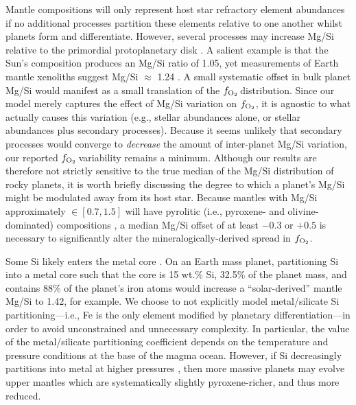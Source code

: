 \documentclass[fleqn,usenatbib,twocolumn]{mnras}
\newcommand{\fo}{$f_{\ce{O2}}$}
\newcommand{\todo}[1]{\textit{\textcolor{violet}{{#1}}}}
\begin{document}
Mantle compositions will only represent host star refractory element abundances if no additional processes partition these elements relative to one another whilst planets form and differentiate. However, several processes may increase Mg/Si relative to the primordial protoplanetary disk \citep{ringwood_significance_1989, tronnes_core_2019, miyazaki_dynamic_2020}. A salient example is that the Sun's composition produces an Mg/Si ratio of 1.05, yet measurements of Earth mantle xenoliths suggest Mg/Si $\approx$ 1.24 \citep[the bulk mantle may not be well-represented by these upper mantle xenoliths;][]{javoy_integral_1995}. A small systematic offset in bulk planet Mg/Si would manifest as a small translation of the \fo\,distribution. Since our model merely captures the effect of Mg/Si variation on \fo, it is agnostic to what actually causes this variation (e.g., stellar abundances alone, or stellar abundances plus secondary processes). Because it seems unlikely that secondary processes would converge to \textit{decrease} the amount of inter-planet Mg/Si variation, our reported \fo\,variability remains a minimum. Although our results are therefore not strictly sensitive to the true median of the Mg/Si distribution of rocky planets, it is worth briefly discussing the degree to which a planet's Mg/Si might be modulated away from its host star. Because mantles with Mg/Si approximately $\in [0.7, 1.5]$ will have pyrolitic (i.e., pyroxene- and olivine-dominated) compositions \citep{guimond_mantle_2023}, a median Mg/Si offset of at least $-0.3$ or $+0.5$ is necessary to significantly alter the mineralogically-derived spread in \fo.


Some Si likely enters the metal core \citep[e.g.,][]{ringwood_chemical_1959, javoy_integral_1995, wood_accretion_2006, schaefer_metal-silicate_2017}. On an Earth mass planet, partitioning Si into a metal core such that the core is 15 wt.\% Si, 32.5\% of the planet mass, and contains 88\% of the planet's iron atoms would increase a ``solar-derived'' mantle Mg/Si to 1.42, for example. We choose to not explicitly model metal/silicate Si partitioning---i.e., Fe is the only element modified by planetary differentiation---in order to avoid unconstrained and unnecessary complexity. In particular, the value of the metal/silicate partitioning coefficient depends on the temperature and pressure conditions at the base of the magma ocean.  %
However, if Si decreasingly partitions into metal at higher pressures \citep{schaefer_metal-silicate_2017}, then more massive planets may evolve upper mantles which are systematically slightly pyroxene-richer, and thus more reduced. 
\end{document}

